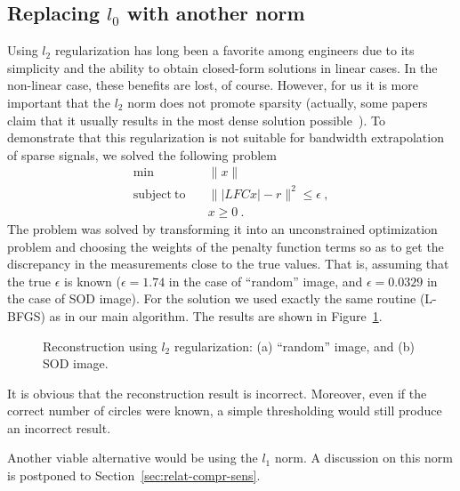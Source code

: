 \subsection{Replacing $l_0$ with another norm}
\label{sec:replacing-l_0-with}
Using $l_{2}$ regularization has long been a favorite among engineers
due to its simplicity and the ability to obtain closed-form solutions
in linear cases. In the non-linear case, these benefits are lost, of
course. However, for us it is more important that the $l_{2}$ norm
does not promote sparsity (actually, some papers claim that it
usually results in the most dense solution
possible~). To demonstrate that this regularization
is not suitable for bandwidth extrapolation of sparse signals, we
solved the following problem
\begin{equation}
  \label{eq:sparse-5}
   \begin{split}
    \min &\quad\|x\| \\
    \mathrm{subject\ to} &\quad \||LFCx| - r\|^{2}\leq\epsilon\ ,\\
    &\quad x \geq 0\ .
  \end{split}
\end{equation}
The problem was solved by  transforming it into an
unconstrained optimization problem and choosing the weights of the
penalty function terms so as to get the discrepancy in the
measurements close to the true values. That is, 
assuming that the true $\epsilon$ is known ($\epsilon=1.74$ in the
case of ``random'' image, and $\epsilon=0.0329$ in the case of SOD
image). For the solution we used exactly the same routine (L-BFGS) as in our
main algorithm. The results are shown in Figure~\ref{fig:l2-rec}.
\begin{figure}[H]
  \centering
  \qquad{}
  \caption[Reconstruction using $l_2$ regularization]{Reconstruction using $l_2$ regularization: (a) ``random''
    image, and (b) SOD image.}
  \label{fig:l2-rec}
\end{figure}
It is obvious that the reconstruction result is incorrect. Moreover, even if the
correct number of circles were known, a simple thresholding would
still 
produce an incorrect result.

Another viable alternative would be using the $l_{1}$ norm. A
discussion on this norm is postponed to
Section~\ref{sec:relat-compr-sens}.

